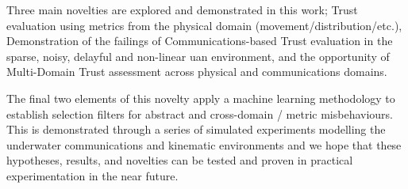 Three main novelties are explored and demonstrated in this work;
Trust evaluation using metrics from the physical domain (movement/distribution/etc.),
Demonstration of the failings of Communications-based Trust evaluation in the sparse, noisy, delayful and non-linear \gls{uan} environment, and the opportunity of
Multi-Domain Trust assessment across physical and communications domains.

The final two elements of this novelty apply a machine learning methodology to establish selection filters for abstract and cross-domain / metric misbehaviours.
This is demonstrated through a series of simulated experiments modelling the underwater communications and kinematic environments and we hope that these hypotheses, results, and novelties can be tested and proven in practical experimentation in the near future.

